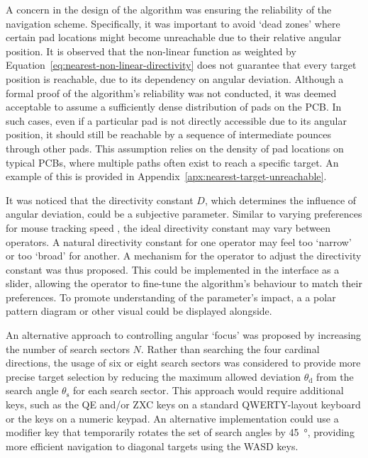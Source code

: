 \documentclass[12pt,british,UKenglish]{article}
\begin{document}
A concern in the design of the algorithm was ensuring the reliability of the navigation scheme.
Specifically, it was important to avoid `dead zones' where certain pad locations might become unreachable due to their relative angular position.
It is observed that the non-linear function as weighted by Equation~\eqref{eq:nearest-non-linear-directivity} does not guarantee that every target position is reachable, due to its dependency on angular deviation.
Although a formal proof of the algorithm's reliability was not conducted, it was deemed acceptable to assume a sufficiently dense distribution of pads on the \ac{PCB}.
In such cases, even if a particular pad is not directly accessible due to its angular position, it should still be reachable by a sequence of intermediate pounces through other pads.
This assumption relies on the density of pad locations on typical \acp{PCB}, where multiple paths often exist to reach a specific target.
An example of this is provided in Appendix~\ref{apx:nearest-target-unreachable}.

It was noticed that the directivity constant $D$, which determines the influence of angular deviation, could be a subjective parameter.
Similar to varying preferences for mouse tracking speed \cite{9893626}, the ideal directivity constant may vary between operators.
A natural directivity constant for one operator may feel too `narrow' or too `broad' for another.
A mechanism for the operator to adjust the directivity constant was thus proposed.
This could be implemented in the interface as a slider, allowing the operator to fine-tune the algorithm's behaviour to match their preferences.
To promote understanding of the parameter's impact, a a polar pattern diagram or other visual could be displayed alongside.

An alternative approach to controlling angular `focus' was proposed by increasing the number of search sectors $N$.
Rather than searching the four cardinal directions, the usage of six or eight search sectors was considered to provide more precise target selection by reducing the maximum allowed deviation $\theta_\text{d}$ from the search angle $\theta_\text{s}$ for each search sector.
This approach would require additional keys, such as the QE and/or ZXC keys on a standard QWERTY-layout keyboard or the keys on a numeric keypad.
An alternative implementation could use a modifier key that temporarily rotates the set of search angles by \qty{45}{\degree}, providing more efficient navigation to diagonal targets using the WASD keys.
\end{document}
